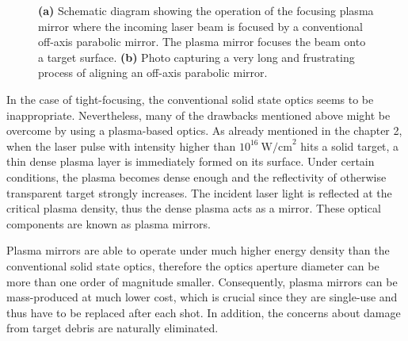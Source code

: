 \begin{figure}[h!]
	\centering
	\hspace{5mm}
	\caption{\textbf{(a)} Schematic diagram showing the operation of the focusing plasma mirror where the incoming laser beam is focused by a conventional off-axis parabolic mirror. The plasma mirror focuses the beam onto a target surface. \textbf{(b)} Photo capturing a very long and frustrating process of aligning an off-axis parabolic mirror.}
	\label{fig:9}
\end{figure}

In the case of tight-focusing, the conventional solid state optics seems to be inappropriate. Nevertheless, many of the drawbacks mentioned above might be overcome by using a plasma-based optics. As already mentioned in the chapter 2, when the laser pulse with intensity higher than $ 10^{16} \ \mathrm{W/cm}^{2} $ hits a solid target, a thin dense plasma layer is immediately formed on its surface. Under certain conditions, the plasma becomes dense enough and the reflectivity of otherwise transparent target strongly increases. The incident laser light is reflected at the critical plasma density, thus the dense plasma acts as a mirror. These optical components are known as plasma mirrors.

Plasma mirrors are able to operate under much higher energy density than the conventional solid state optics, therefore the optics aperture diameter can be more than one order of magnitude smaller. Consequently, plasma mirrors can be mass-produced at much lower cost, which is crucial since they are single-use and thus have to be replaced after each shot. In addition, the concerns about damage from target debris are naturally eliminated.

